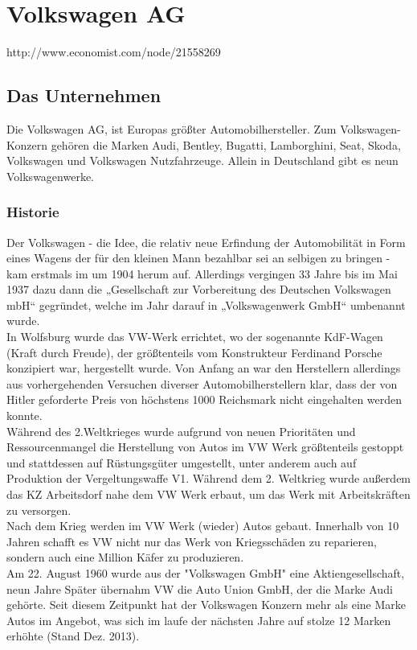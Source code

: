 \documentclass[12pt]{article}
\begin{document}
\section{Volkswagen AG}
http://www.economist.com/node/21558269
\subsection{Das Unternehmen}
Die Volkswagen AG, ist Europas größter Automobilhersteller. Zum Volkswagen-Konzern gehören die Marken Audi, Bentley, Bugatti, Lamborghini, Seat, Skoda, Volkswagen und Volkswagen Nutzfahrzeuge. Allein in Deutschland gibt es neun Volkswagenwerke.

\subsubsection{Historie}
Der Volkswagen - die Idee, die relativ neue Erfindung der Automobilität in Form eines Wagens der für den kleinen Mann bezahlbar sei an selbigen zu bringen - kam erstmals im um 1904 herum auf. Allerdings vergingen 33 Jahre bis im Mai 1937 dazu dann die „Gesellschaft zur Vorbereitung des Deutschen Volkswagen mbH“ gegründet, welche im Jahr darauf in „Volkswagenwerk GmbH“ umbenannt wurde.\cite{vwchronik} \\
In Wolfsburg wurde das VW-Werk errichtet, wo der sogenannte KdF-Wagen (Kraft durch Freude), der größtenteils vom Konstrukteur Ferdinand Porsche konzipiert war, hergestellt wurde. Von Anfang an war den Herstellern allerdings aus vorhergehenden Versuchen diverser Automobilherstellern klar, dass der von Hitler geforderte Preis von höchstens 1000 Reichsmark nicht eingehalten werden konnte. \cite{geschdautos}\\
Während des 2.Weltkrieges wurde aufgrund von neuen Prioritäten und Ressourcenmangel die Herstellung von Autos im VW Werk größtenteils gestoppt und stattdessen auf Rüstungsgüter umgestellt, unter anderem auch auf Produktion der Vergeltungswaffe V1.\cite{autowp} Während dem 2. Weltkrieg wurde außerdem das KZ Arbeitsdorf nahe dem VW Werk erbaut, um das Werk mit Arbeitskräften zu versorgen.\cite{terror}  
\\
Nach dem Krieg werden im VW Werk (wieder) Autos gebaut. Innerhalb von 10 Jahren schafft es VW nicht nur das Werk von Kriegsschäden zu reparieren, sondern auch eine Million Käfer zu produzieren. \cite{ahwest}\\
Am 22. August 1960 wurde aus der "Volkswagen GmbH" eine Aktiengesellschaft, neun Jahre Später übernahm VW die Auto Union GmbH, der die Marke Audi gehörte. Seit diesem Zeitpunkt hat der Volkswagen Konzern mehr als eine Marke Autos im Angebot, was sich im laufe der nächsten Jahre auf stolze 12 Marken erhöhte (Stand Dez. 2013). \cite{vwag}
\end{document}
